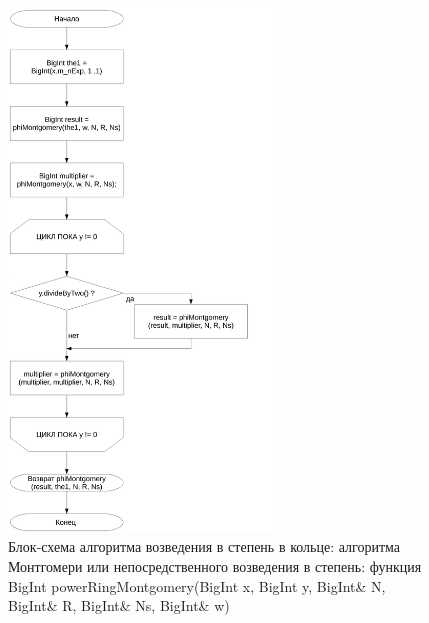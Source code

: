 \documentclass[a4paper,12pt]{article} %
\begin{document}
\begin{figure}[ht]
	\centering
	\includegraphics[width=0.64\textwidth]{lr5_powerRingMontgomery.pdf}
	\caption{
		Блок-схема алгоритма возведения в степень в кольце: алгоритма Монтгомери или непосредственного возведения в степень:
		функция BigInt powerRingMontgomery(BigInt x, BigInt y, BigInt\& N, BigInt\& R, BigInt\& Ns, BigInt\& w)
	}
	\label{bs_lr5_powerRingMontgomery}
\end{figure}
\end{document}

